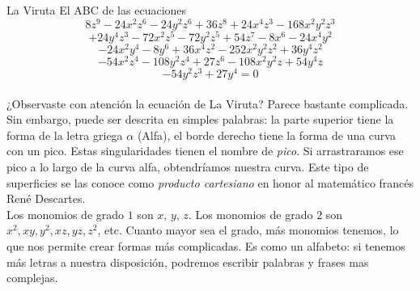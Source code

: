 \begin{surferPage}{La Viruta}
El ABC de las ecuaciones
\[8z^9-24x^2z^6-24y^2z^6+36z^8+24x^4z^3-168x^2y^2z^3\]
\[+24y^4z^3-72x^2z^5-72y^2z^5+54z^7-8x^6-24x^4y^2\]
\[-24x^2y^4-8y^6 + 36x^4z^2-252x^2y^2z^2+36y^4z^2\]
\[- 54x^2z^4-108y^2z^4 + 27z^6-108x^2y^2z + 54y^4z\]
\[-54y^2z^3 + 27y^4 = 0\]\\
\vspace{0.25cm}
¿Observaste con atención la ecuación de La Viruta? Parece bastante complicada.
Sin embargo, puede ser descrita en simples palabras: la parte superior tiene la forma de la letra griega $\alpha$ (Alfa), el borde derecho tiene la forma de una curva con un pico. Estas singularidades tienen el nombre de {\it pico}. Si arrastraramos ese pico a lo largo de la curva alfa, obtendríamos nuestra curva. Este tipo de superficies se las conoce como {\it producto cartesiano} en honor al matemático francés Ren\'e Descartes.\\
\vspace{0.25cm}
Los monomios de grado $1$ son $x$, $y$, $z$. Los monomios de grado $2$ son $x^2, xy, y^2, xz, yz, z^2$, etc. Cuanto mayor sea el grado, más monomios tenemos, lo que nos permite crear formas más complicadas. Es como un alfabeto: si tenemos más letras a nuestra disposición, podremos escribir palabras y frases mas complejas.
\end{surferPage}

